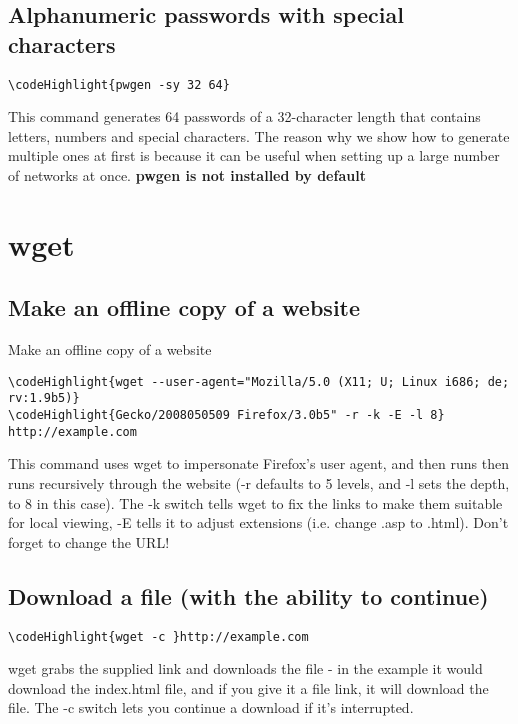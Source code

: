 \documentclass[12pt,a4paper]{article}
\begin{document}
\subsection{Alphanumeric passwords with special characters}
\begin{Verbatim}[commandchars=\\\{\}]
\codeHighlight{pwgen -sy 32 64}
\end{Verbatim}
This command generates 64 passwords of a 32-character length that contains letters, numbers and special characters.  The reason why we show how to generate multiple ones at first is because it can be useful when setting up a large number of networks at once.  \textbf{pwgen is not installed by default}

\section{wget}
\subsection{Make an offline copy of a website}
\label{}Make an offline copy of a website
\begin{Verbatim}[commandchars=\\\{\}]
\codeHighlight{wget --user-agent="Mozilla/5.0 (X11; U; Linux i686; de; rv:1.9b5)}
\codeHighlight{Gecko/2008050509 Firefox/3.0b5" -r -k -E -l 8} http://example.com
\end{Verbatim}
This command uses wget to impersonate Firefox's user agent, and then runs then runs recursively through the website (-r defaults to 5 levels, and -l sets the depth, to 8 in this case).  The -k switch tells wget to fix the links to make them suitable for local viewing, -E tells it to adjust extensions (i.e. change .asp to .html).  Don't forget to change the URL!

\subsection{Download a file (with the ability to continue)}
\begin{Verbatim}[commandchars=\\\{\}]
\codeHighlight{wget -c }http://example.com
\end{Verbatim}
wget grabs the supplied link and downloads the file - in the example it would download the index.html file, and if you give it a file link, it will download the file.  The -c switch lets you continue a download if it's interrupted.
\end{document}
